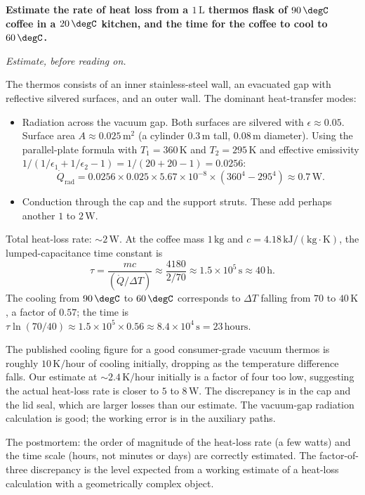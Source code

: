 \begin{estimation}
\textbf{Estimate the rate of heat loss from a $1\,\text{L}$ thermos
flask of $90\,\degC$ coffee in a $20\,\degC$ kitchen, and the time
for the coffee to cool to $60\,\degC$.}

\smallskip
\textit{Estimate, before reading on.}

\smallskip
The thermos consists of an inner stainless-steel wall, an evacuated
gap with reflective silvered surfaces, and an outer wall. The
dominant heat-transfer modes:

\begin{itemize}[leftmargin=*]
  \item Radiation across the vacuum gap. Both surfaces are silvered
    with $\epsilon \approx 0.05$. Surface area $A \approx 0.025\,\text{m}^2$
    (a cylinder $0.3\,\text{m}$ tall, $0.08\,\text{m}$ diameter).
    Using the parallel-plate formula with $T_1 = 360\,\si{\kelvin}$ and
    $T_2 = 295\,\si{\kelvin}$ and effective emissivity $1/(1/\epsilon_1
    + 1/\epsilon_2 - 1) = 1/(20 + 20 - 1) = 0.0256$:
    \[
    \dot{Q}_{\text{rad}} = 0.0256 \times 0.025 \times 5.67 \times 10^{-8}
    \times (360^4 - 295^4) \approx 0.7\,\text{W}.
    \]
  \item Conduction through the cap and the support struts. These add
    perhaps another $1$ to $2\,\text{W}$.
\end{itemize}

Total heat-loss rate: $\sim 2\,\text{W}$. At the coffee mass
$1\,\text{kg}$ and $c = 4.18\,\text{kJ}/(\text{kg}\cdot\si{\kelvin})$,
the lumped-capacitance time constant is
\[
\tau = \frac{m c}{(\dot{Q}/\Delta T)} \approx \frac{4180}{2/70} \approx
1.5 \times 10^5\,\text{s} \approx 40\,\text{h}.
\]
The cooling from $90\,\degC$ to $60\,\degC$ corresponds to $\Delta T$
falling from $70$ to $40\,\si{\kelvin}$, a factor of $0.57$; the time
is $\tau \ln(70/40) \approx 1.5 \times 10^5 \times 0.56 \approx 8.4
\times 10^4\,\text{s} = 23\,\text{hours}$.

The published cooling figure for a good consumer-grade vacuum thermos
is roughly $10\,\si{\kelvin}/\text{hour}$ of cooling initially, dropping
as the temperature difference falls. Our estimate at $\sim 2.4\,\si{
\kelvin}/\text{hour}$ initially is a factor of four too low, suggesting
the actual heat-loss rate is closer to $5$ to $8\,\text{W}$. The
discrepancy is in the cap and the lid seal, which are larger losses
than our estimate. The vacuum-gap radiation calculation is good; the
working error is in the auxiliary paths.

The postmortem: the order of magnitude of the heat-loss rate
(a few watts) and the time scale (hours, not minutes or days) are
correctly estimated. The factor-of-three discrepancy is the level
expected from a working estimate of a heat-loss calculation with a
geometrically complex object.
\end{estimation}


